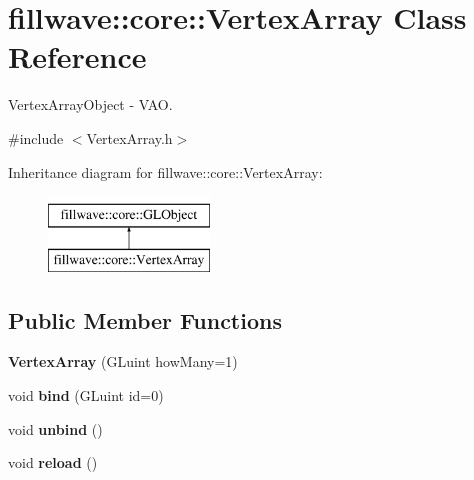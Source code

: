 \hypertarget{classfillwave_1_1core_1_1VertexArray}{}\section{fillwave\+:\+:core\+:\+:Vertex\+Array Class Reference}
\label{classfillwave_1_1core_1_1VertexArray}


Vertex\+Array\+Object -\/ V\+A\+O.  




{\ttfamily \#include $<$Vertex\+Array.\+h$>$}

Inheritance diagram for fillwave\+:\+:core\+:\+:Vertex\+Array\+:\begin{figure}[H]
\begin{center}
\leavevmode
\includegraphics[height=2.000000cm]{classfillwave_1_1core_1_1VertexArray}
\end{center}
\end{figure}
\subsection*{Public Member Functions}
\begin{DoxyCompactItemize}
\item 
\hypertarget{classfillwave_1_1core_1_1VertexArray_a710d6e0d4e7cb92f3eb9786b2d9770ea}{}{\bfseries Vertex\+Array} (G\+Luint how\+Many=1)\label{classfillwave_1_1core_1_1VertexArray_a710d6e0d4e7cb92f3eb9786b2d9770ea}

\item 
\hypertarget{classfillwave_1_1core_1_1VertexArray_a7d4b694e3f39a41b12e4bf4ec92d2555}{}void {\bfseries bind} (G\+Luint id=0)\label{classfillwave_1_1core_1_1VertexArray_a7d4b694e3f39a41b12e4bf4ec92d2555}

\item 
\hypertarget{classfillwave_1_1core_1_1VertexArray_ad3a8f6fa7e18789098c51b671588f360}{}void {\bfseries unbind} ()\label{classfillwave_1_1core_1_1VertexArray_ad3a8f6fa7e18789098c51b671588f360}

\item 
\hypertarget{classfillwave_1_1core_1_1VertexArray_a9a7fcf6f214032f1ddc99d82ca4f51bb}{}void {\bfseries reload} ()\label{classfillwave_1_1core_1_1VertexArray_a9a7fcf6f214032f1ddc99d82ca4f51bb}

\end{DoxyCompactItemize}
